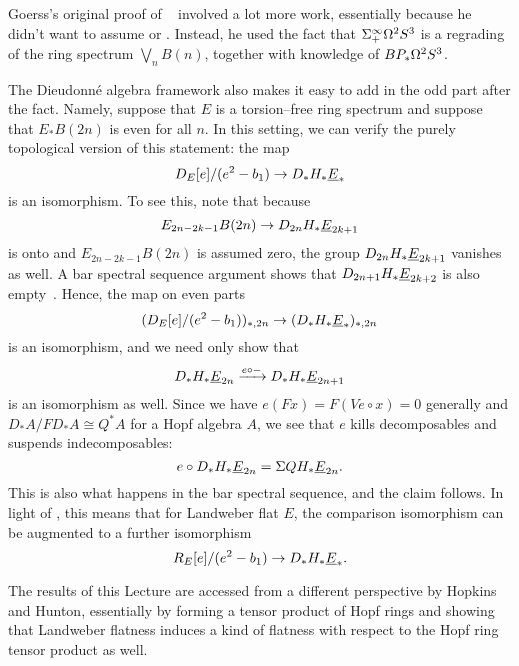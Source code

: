 \begin{remark}
Goerss's original proof of ~\cite{GoerssDieudonne} involved a lot more work, essentially because he didn't want to assume  or .  Instead, he used the fact that \(\Sigma^\infty_+ \Omega^2 S^3\) is a regrading of the ring spectrum \(\bigvee_n B(n)\), together with knowledge of \(BP_* \Omega^2 S^3\).
\end{remark}

\begin{remark}
The Dieudonn\'e algebra framework also makes it easy to add in the odd part after the fact.  Namely, suppose that \(E\) is a torsion--free ring spectrum and suppose that \(E_* B(2n)\) is even for all \(n\).  In this setting, we can verify the purely topological version of this statement: the map \[D_E[e] / (e^2 - b_1) \to D_* H_* \OS{E}{*}\] is an isomorphism.  To see this, note that because \[E_{2n-2k-1} B(2n) \to D_{2n} H_* \OS{E}{2k+1}\] is onto and \(E_{2n-2k-1} B(2n)\) is assumed zero, the group \(D_{2n} H_* \OS{E}{2k+1}\) vanishes as well.  A bar spectral sequence argument shows that \(D_{2n+1} H_* \OS{E}{2k+2}\) is also empty~\cite[Lemma 11.5.1]{GoerssDieudonne}.  Hence, the map on even parts \[(D_E[e] / (e^2 - b_1))_{*, 2n} \to (D_* H_* \OS{E}{*})_{*, 2n}\] is an isomorphism, and we need only show that \[D_* H_* \OS{E}{2n} \xrightarrow{e \circ -} D_* H_* \OS{E}{2n+1}\] is an isomorphism as well.  Since we have \(e(Fx) = F(Ve \circ x) = 0\) generally and \(D_* A / FD_* A \cong Q^* A\) for a Hopf algebra \(A\), we see that \(e\) kills decomposables and suspends indecomposables: \[e \circ D_* H_* \OS{E}{2n} = \Susp QH_* \OS{E}{2n}.\]  This is also what happens in the bar spectral sequence, and the claim follows.  In light of , this means that for Landweber flat \(E\), the comparison isomorphism can be augmented to a further isomorphism \[R_E[e] / (e^2 - b_1) \to D_* H_* \OS{E}{*}.\]
\end{remark}

\begin{remark}
The results of this Lecture are accessed from a different perspective by Hopkins and Hunton, essentially by forming a tensor product of Hopf rings and showing that Landweber flatness induces a kind of flatness with respect to the Hopf ring tensor product as well.
\end{remark}


